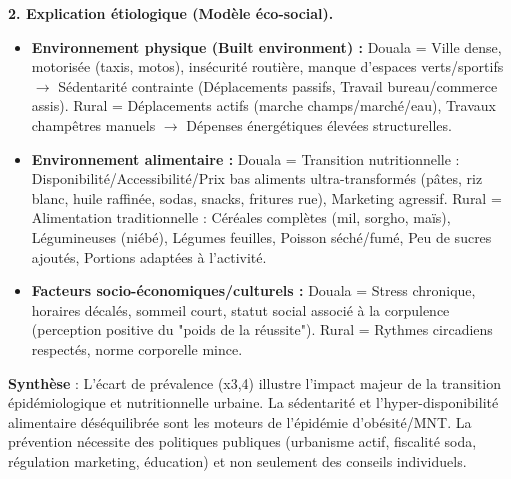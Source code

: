 \documentclass[11pt]{article}
\newcommand{\cle}[1]{{\popxbold\color{popdark}#1}}
\begin{document}
\begin{exoresolu}
\textbf{2. Explication étiologique (Modèle éco-social).}
\begin{itemize}
\item \textbf{Environnement physique (Built environment) :} Douala = Ville dense, motorisée (taxis, motos), insécurité routière, manque d'espaces verts/sportifs $\rightarrow$ \cle{Sédentarité contrainte} (Déplacements passifs, Travail bureau/commerce assis). Rural = Déplacements actifs (marche champs/marché/eau), Travaux champêtres manuels $\rightarrow$ \cle{Dépenses énergétiques élevées} structurelles.
\item \textbf{Environnement alimentaire :} Douala = \cle{Transition nutritionnelle} : Disponibilité/Accessibilité/Prix bas aliments ultra-transformés (pâtes, riz blanc, huile raffinée, sodas, snacks, fritures rue), Marketing agressif. Rural = Alimentation \cle{traditionnelle} : Céréales complètes (mil, sorgho, maïs), Légumineuses (niébé), Légumes feuilles, Poisson séché/fumé, Peu de sucres ajoutés, Portions adaptées à l'activité.
\item \textbf{Facteurs socio-économiques/culturels :} Douala = Stress chronique, horaires décalés, sommeil court, statut social associé à la corpulence (perception positive du "poids de la réussite"). Rural = Rythmes circadiens respectés, norme corporelle mince.
\end{itemize}
\textbf{Synthèse} : L'écart de prévalence (x3,4) illustre l'impact majeur de la \cle{transition épidémiologique et nutritionnelle} urbaine. La sédentarité et l'hyper-disponibilité alimentaire déséquilibrée sont les moteurs de l'épidémie d'obésité/MNT. La prévention nécessite des politiques publiques (urbanisme actif, fiscalité soda, régulation marketing, éducation) et non seulement des conseils individuels.
\end{exoresolu}
\end{document}
